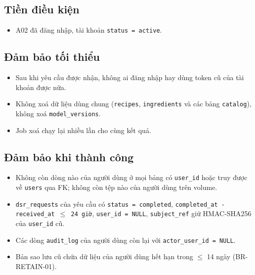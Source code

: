 \subsection{Tiền điều kiện}
\begin{itemize}
\item A02 đã đăng nhập, tài khoản {\small\texttt{status = active}}.
\end{itemize}
\subsection{Đảm bảo tối thiểu}
\begin{itemize}
\item Sau khi yêu cầu được nhận, không ai đăng nhập hay dùng token cũ của tài khoản được nữa.
\item Không xoá dữ liệu dùng chung ({\small\texttt{recipes}}, {\small\texttt{ingredients}} và các bảng {\small\texttt{catalog}}), không xoá {\small\texttt{model\_\allowbreak{}\allowbreak{}versions}}.
\item Job xoá chạy lại nhiều lần cho cùng kết quả.
\end{itemize}
\subsection{Đảm bảo khi thành công}
\begin{itemize}
\item Không còn dòng nào của người dùng ở mọi bảng có {\small\texttt{user\_\allowbreak{}\allowbreak{}id}} hoặc truy được về {\small\texttt{users}} qua FK; không còn tệp nào của người dùng trên volume.
\item {\small\texttt{dsr\_\allowbreak{}\allowbreak{}requests}} của yêu cầu có {\small\texttt{status = completed}}, {\small\texttt{completed\_\allowbreak{}\allowbreak{}at - received\_\allowbreak{}\allowbreak{}at \ensuremath{\leq} 24 giờ}}, {\small\texttt{user\_\allowbreak{}\allowbreak{}id = NULL}}, {\small\texttt{subject\_\allowbreak{}\allowbreak{}ref}} giữ HMAC-\allowbreak{}SHA256 của {\small\texttt{user\_\allowbreak{}\allowbreak{}id}} cũ.
\item Các dòng {\small\texttt{audit\_\allowbreak{}\allowbreak{}log}} của người dùng còn lại với {\small\texttt{actor\_\allowbreak{}\allowbreak{}user\_\allowbreak{}\allowbreak{}id = NULL}}.
\item Bản sao lưu cũ chứa dữ liệu của người dùng hết hạn trong \ensuremath{\leq} 14 ngày (BR-\allowbreak{}RETAIN-\allowbreak{}01).
\end{itemize}

